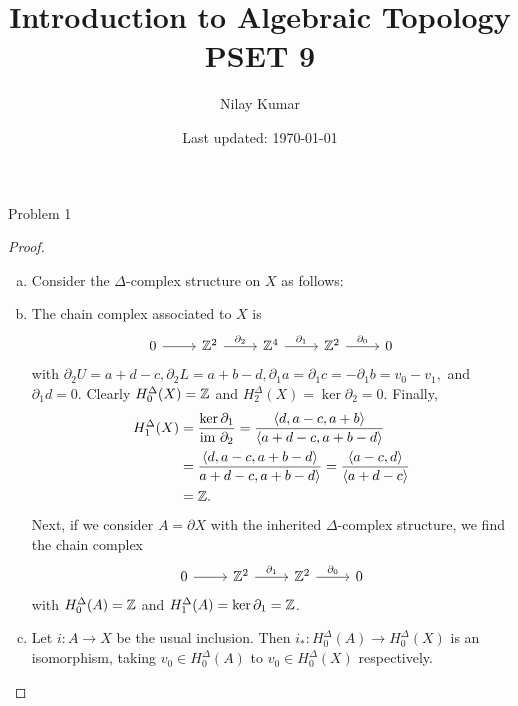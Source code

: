 \documentclass{../../mathnotes}
\title{Introduction to Algebraic Topology PSET 9}
\author{Nilay Kumar}
\date{Last updated: \today}
\begin{document}
\maketitle

\begin{prop}
    Problem 1
\end{prop}
\begin{proof}
    \hfill
    \begin{enumerate}[(a)]
        \item Consider the $\Delta$-complex structure on $X$ as follows:
            \vspace{2cm}
        \item The chain complex associated to $X$ is
            \begin{equation}
                \begin{tikzcd}
                    0\ar{r} & \Z^2\ar{r}{\partial_2} & \Z^4\ar{r}{\partial_1} & \Z^2\ar{r}{\partial_0} & 0
                \end{tikzcd}
                \label{cd:1}
            \end{equation}
            with $\partial_2U=a+d-c,\partial_2L=a+b-d,\partial_1a=\partial_1c=-\partial_1b=v_0-v_1,$ and $\partial_1d=0$.
            Clearly $H^\Delta_0(X)=\mathbb{Z}$ and $H^\Delta_2(X)=\ker\partial_2=0$. Finally,
            \begin{align*}
                H^\Delta_1(X)&=\frac{\ker\partial_1}{\text{im }\partial_2}=\frac{\langle d,a-c,a+b\rangle}{\langle a+d-c,a+b-d\rangle}\\
                &=\frac{\langle d,a-c,a+b-d\rangle}{a+d-c,a+b-d\rangle}=\frac{\langle a-c,d\rangle}{\langle a+d-c\rangle}\\
                &=\mathbb{Z}.
            \end{align*}
            Next, if we consider $A=\partial X$ with the inherited $\Delta$-complex structure, we find the chain complex
            \begin{equation}
                \begin{tikzcd}
                    0\ar{r} & \Z^2\ar{r}{\partial_1} & \Z^2\ar{r}{\partial_0} & 0
                \end{tikzcd}
                \label{cd:2}
            \end{equation}
            with $H_0^\Delta(A)=\mathbb{Z}$ and $H_1^\Delta(A)=\ker\partial_1=\mathbb{Z}$.
        \item Let $i:A\to X$ be the usual inclusion. Then $i_*:H^\Delta_0(A)\to H^\Delta_0(X)$ is an
            isomorphism, taking $v_0\in H_0^\Delta(A)$ to $v_0\in H_0^\Delta(X)$ respectively.

\end{enumerate}
\end{proof}
\end{document}
